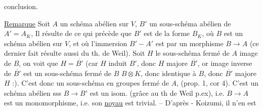 conclusion.

\uline{Remarque} Soit $A$ un schéma abélien sur $V$,
$B'$ un sous-schéma abélien de $A'=A_K$,
Il résulte de ce qui précède que $B'$
est de la forme $B_K$, où $B$ est un
schéma abélien sur $V$, et où l'immersion
$B'\mathrel{-}A'$ est  par un morphisme
$B\longrightarrow A$ (ce dernier fait résulte
aussi du th. de Weil).  Soit
$H$ le sous-schéma fermé de $A$ image de $B$,
on voit  que $H=\overline{B'}$ (car $H$
induit $B'$,  donc $H$ majore $\overline{B'}$,
or  image inverse de $\overline{B'}$ est un
sous-schéma fermé de $B$  $B\otimes K$, donc
identique à $B$, donc $\overline{B'}$  majore $H$ :).
C'est donc un sous-schéma en groupes
fermé de $A$,  (prop. 1, cor 4). C'est
un schéma abélien sss $B\longrightarrow B'$ est
un isom. (grâce au th de Weil p.ex),
i.e. $B\longrightarrow A$ est un monomorphisme,
i.e. son \uline{noyau} est  trivial. --
D'après  - Koizumi, il n'en est


